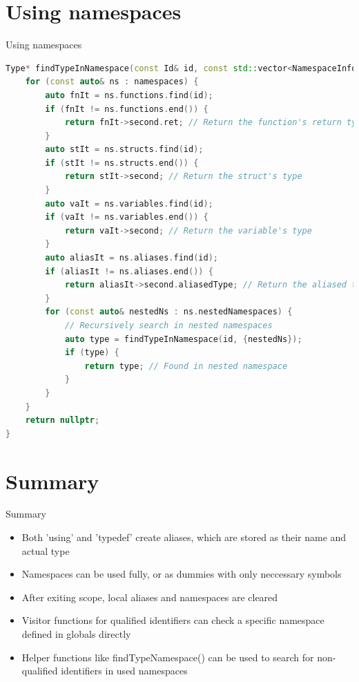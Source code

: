 \documentclass{beamer}
\begin{document}
\section{Using namespaces}
\begin{frame}[fragile,shrink=15]{Using namespaces}
  \lstset{basicstyle=\ttfamily\scriptsize}
  \begin{lstlisting}[language=C++]
Type* findTypeInNamespace(const Id& id, const std::vector<NamespaceInfo>& namespaces) {
    for (const auto& ns : namespaces) {
        auto fnIt = ns.functions.find(id);
        if (fnIt != ns.functions.end()) {
            return fnIt->second.ret; // Return the function's return type
        }
        auto stIt = ns.structs.find(id);
        if (stIt != ns.structs.end()) {
            return stIt->second; // Return the struct's type
        }
        auto vaIt = ns.variables.find(id);
        if (vaIt != ns.variables.end()) {
            return vaIt->second; // Return the variable's type
        }
        auto aliasIt = ns.aliases.find(id);
        if (aliasIt != ns.aliases.end()) {
            return aliasIt->second.aliasedType; // Return the aliased type
        }
        for (const auto& nestedNs : ns.nestedNamespaces) {
            // Recursively search in nested namespaces
            auto type = findTypeInNamespace(id, {nestedNs});
            if (type) {
                return type; // Found in nested namespace
            }
        }
    }
    return nullptr;
}
\end{lstlisting}
\end{frame}
\section{Summary}
\begin{frame}{Summary}
\begin{itemize}
  \item Both 'using' and 'typedef' create aliases, which are stored as their name and actual type
  \item Namespaces can be used fully, or as dummies with only neccessary symbols
  \item After exiting scope, local aliases and namespaces are cleared
  \item Visitor functions for qualified identifiers can check a specific namespace defined in globals directly
  \item Helper functions like findTypeNamespace() can be used to search for non-qualified identifiers in used namespaces
\end{itemize}

\end{frame}
\end{document}
